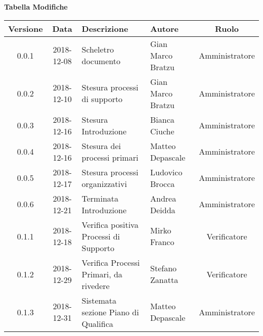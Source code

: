 \begin{center}
	\textbf{Tabella Modifiche}
	\end{center}
	\begin{center}
		\begin{tabularx}{\textwidth}{|c|c|X|X|c|}
			\hline
			\textbf{Versione} & \textbf{Data} & \textbf{Descrizione} & \textbf{Autore} & \textbf{Ruolo} \\
			\hline
			0.0.1 & 2018-12-08 & Scheletro documento  & Gian Marco Bratzu & Amministratore\\
			\hline
			0.0.2 & 2018-12-10 & Stesura processi di supporto & Gian Marco Bratzu & Amministratore\\	
			\hline
			0.0.3 & 2018-12-16 & Stesura Introduzione & Bianca Ciuche & Amministratore\\
			\hline
			0.0.4 & 2018-12-16 & Stesura dei processi primari & Matteo Depascale & Amministratore\\
			\hline
			0.0.5 & 2018-12-17 & Stesura processi organizzativi & Ludovico Brocca & Amministratore\\
			\hline
			0.0.6 & 2018-12-21 & Terminata Introduzione & Andrea Deidda & Amministratore\\
			\hline
			0.1.1 & 2018-12-18 & Verifica positiva Processi di Supporto & Mirko Franco & Verificatore\\
			\hline
			0.1.2 & 2018-12-29 & Verifica Processi Primari, da rivedere & Stefano Zanatta & Verificatore\\
			\hline
			0.1.3 & 2018-12-31 & Sistemata sezione Piano di Qualifica & Matteo Depascale & Amministratore\\
			\hline
		\end{tabularx}
	\end{center}

\newpage